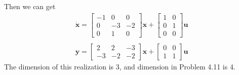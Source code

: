 \documentclass{article}
\begin{document}
Then we can get
$$
\begin{array}{l}
\dot{\pmb{x}}=\left[\begin{array}{ccc}
-1 & 0 & 0 \\
0 & -3 & -2 \\
0 & 1 & 0
\end{array}\right] \pmb{x}+\left[\begin{array}{cc}
1 & 0 \\
0 & 1 \\
0 & 0
\end{array}\right] \pmb{u} \\
~\\
\pmb{y}=\left[\begin{array}{ccc}
2 & 2 & -3 \\
-3 & -2 & -2
\end{array}\right] \pmb{x}+\left[\begin{array}{cc}
0 & 0 \\
1 & 1
\end{array}\right] \pmb{u}
\end{array}
$$
The dimension of this realization is 3, and dimension in Problem 4.11 is 4.
\end{document}
